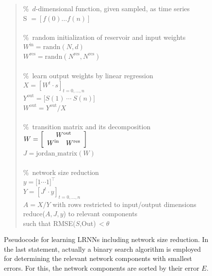 \documentclass[twoside,11pt]{article}
\theoremstyle{definition}
\begin{document}
\begin{figure}[ht]
\begin{quote}
	\newcommand{\commt}[1]{\%~#1\\}%
	\commt{$d$-dimensional function, given sampled, as time series}
	S $= [ f(0) \dots f(n) ]$\\
	\\
	\commt{random initialization of reservoir and input weights}
	$W^\mathrm{in} = \mathrm{randn}(N,d)$\\
	$W^\mathrm{res} = \mathrm{randn}(N^\mathrm{res},N^\mathrm{res})$\\
	\\
	\commt{learn output weights by linear regression}
	$X = \left[W^t \cdot s\right]_{t=0,\dots,n}$\\
	$Y^\mathrm{out} = \big[ S(1)\ \cdots\ S(n) \big]$\\
	$W^\mathrm{out} = Y^\mathrm{out}/X$\\
	\\
	\commt{transition matrix and its decomposition}
	$W = \left[ \begin{array}{cc}
		\multicolumn{2}{c}{W^\mathrm{out}}\\
		W^\mathrm{in} & W^\mathrm{res}
	\end{array} \right]$\\
	$J = \mathrm{jordan\_matrix}(W)$\\
	\\
	\commt{network size reduction}
	$y = \big[ 1 \cdots 1 \big]^\top$\\
	$Y = \left[J^t \cdot y\right]_{t=0,\dots,n}$\\
	$A = X/Y$ with rows restricted to input/output dimensions\\
	reduce($A,J,y$) to relevant components\\
	\hspace*{0.5cm} such that RMSE($S$,Out)\,$<\theta$
\end{quote}
\caption{Pseudocode for learning LRNNs including network size reduction. In the
last statement, actually a binary search algorithm is employed for determining
the relevant network components with smallest errors. For this, the network
components are sorted by their error $E$.}
\label{proc}
\end{figure}
\end{document}
